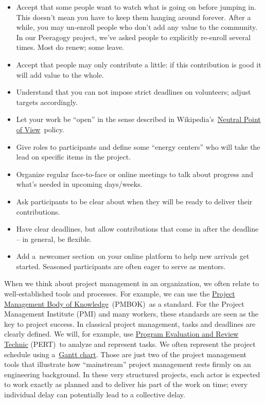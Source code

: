 \begin{itemize}
\itemsep1pt\parskip0pt
\item
  Accept that some people want to watch what is going on before jumping
  in. This doesn't mean you have to keep them hanging around forever.
  After a while, you may un-enroll people who don't add any value to the
  community. In our Peeragogy project, we've asked people to explicitly
  re-enroll several times. Most do renew; some leave.
\item
  Accept that people may only contribute a little: if this contribution
  is good it will add value to the whole.
\item
  Understand that you can not impose strict deadlines on volunteers;
  adjust targets accordingly.
\item
  Let your work be ``open'' in the sense described in
  Wikipedia's~\href{http://en.wikipedia.org/wiki/Wikipedia:Neutral_point_of_view}{Neutral
  Point of View}~policy.
\item
  Give roles to participants and define some ``energy centers'' who will
  take the lead on specific items in the project.
\item
  Organize regular face-to-face or online meetings to talk about
  progress and what's needed in upcoming days/weeks.
\item
  Ask participants to be clear about when they will be ready to deliver
  their contributions.
\item
  Have clear deadlines, but allow contributions that come in after the
  deadline -- in general, be flexible.
\item
  Add a~newcomer section~on your online platform to help new arrivals
  get started. Seasoned participants are often eager to serve as
  mentors.
\end{itemize}

When we think about project management in an organization, we often
relate to well-established tools and processes. For example, we can use
the \href{http://www.pmi.org/PMBOK-Guide-and-Standards.aspx}{Project
Management Body of Knowledge}~(PMBOK)~as a standard. For the Project
Management Institute (PMI) and many workers, these standards are seen as
the key to project success. In classical project management, tasks and
deadlines are clearly defined. We will, for example, use
\href{http://en.wikipedia.org/wiki/PERT}{Program Evaluation and Review
Technic} (PERT)~to analyze and represent tasks. We often represent the
project schedule using
a~\href{http://en.wikipedia.org/wiki/Gantt_chart}{Gantt chart}. Those
are just two of the project management tools that illustrate how
``mainstream'' project management rests firmly on an engineering
background. In these very structured projects, each actor is expected to
work exactly as planned and to deliver his part of the work on time;
every individual delay can potentially lead to a collective delay.

